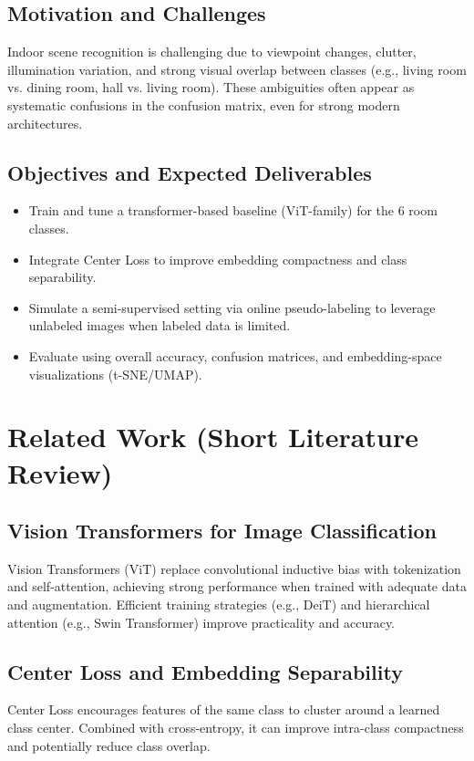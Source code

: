 \documentclass[english]{teza-upb_en}
\begin{document}
\section{Motivation and Challenges}
Indoor scene recognition is challenging due to viewpoint changes, clutter, illumination variation, and strong visual overlap between classes (e.g., living room vs. dining room, hall vs. living room).
These ambiguities often appear as systematic confusions in the confusion matrix, even for strong modern architectures.

\section{Objectives and Expected Deliverables}
\begin{itemize}
  \item Train and tune a transformer-based baseline (ViT-family) for the 6 room classes.
  \item Integrate Center Loss to improve embedding compactness and class separability.
  \item Simulate a semi-supervised setting via online pseudo-labeling to leverage unlabeled images when labeled data is limited.
  \item Evaluate using overall accuracy, confusion matrices, and embedding-space visualizations (t-SNE/UMAP).
\end{itemize}

\chapter{Related Work (Short Literature Review)}

\section{Vision Transformers for Image Classification}
Vision Transformers (ViT) replace convolutional inductive bias with tokenization and self-attention, achieving strong performance when trained with adequate data and augmentation.
Efficient training strategies (e.g., DeiT) and hierarchical attention (e.g., Swin Transformer) improve practicality and accuracy.

\section{Center Loss and Embedding Separability}
Center Loss encourages features of the same class to cluster around a learned class center.
Combined with cross-entropy, it can improve intra-class compactness and potentially reduce class overlap.
\end{document}
